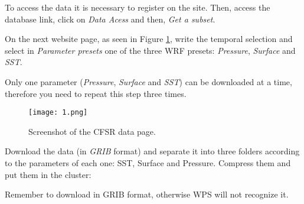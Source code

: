  To access the data it is necessary to register on the site. Then, access the database link,
click on \textit{Data Acess} and then, \textit{Get a subset}.
\bigskip

 On the next website page, as seen in Figure \textcolor{bleu_cite}{\ref{detalhacfsr}}, write the temporal selection
and select in \textit {Parameter presets} one of the three WRF presets: \textit{Pressure},
\textit{Surface} and \textit{SST}. 
\bigskip

\begin{tcolorbox}[enhanced,
    grow to left by=0cm,%
    grow to right by=0cm,%
    enlarge top by=0cm,%
    enlarge bottom by=0cm,%
    tcbox raise base,
    boxrule=1.0pt,
    left=18mm,
    colframe=red!50!black,coltext=red!25!black,colback=red!10!white,
    overlay={\begin{tcbclipinterior}\fill[red!75!blue!50!white] (frame.south west)
      rectangle node[text=white,font=\sffamily\bfseries\footnotesize,rotate=0] {WARNING} ([xshift=18mm]frame.north west);\end{tcbclipinterior}}]
      Only one parameter (\textit{Pressure}, \textit{Surface} and \textit{SST}) can be downloaded at a time, therefore you need to repeat this step three times.
\end{tcolorbox}
\bigskip

\begin{figure}[H]
    \centering
    \texttt{[image: 1.png]}
    \caption{Screenshot of the CFSR data page.}
    \label{detalhacfsr}
\end{figure}
\bigskip

 Download the data (in \textit{GRIB} format) and separate it into three folders according to the parameters of each one:
SST, Surface and Pressure. Compress them and put them in the cluster:
\bigskip

\begin{tcolorbox}[enhanced,
    grow to left by=0cm,%
    grow to right by=0cm,%
    enlarge top by=0cm,%
    enlarge bottom by=0cm,%
    tcbox raise base,
    boxrule=1.0pt,
    left=18mm,
    colframe=red!50!black,coltext=red!25!black,colback=red!10!white,
    overlay={\begin{tcbclipinterior}\fill[red!75!blue!50!white] (frame.south west)
      rectangle node[text=white,font=\sffamily\bfseries\footnotesize,rotate=0] {WARNING} ([xshift=18mm]frame.north west);\end{tcbclipinterior}}]
      Remember to download in GRIB format, otherwise WPS will not recognize it.
\end{tcolorbox}
\bigskip

